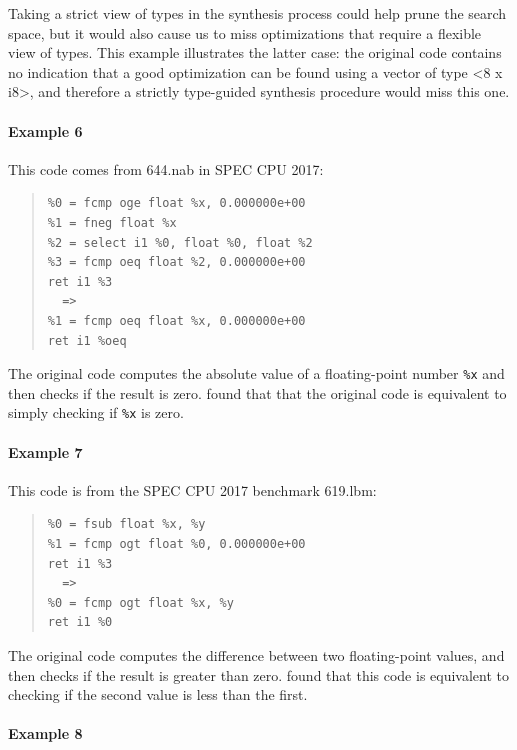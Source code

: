 Taking a strict view of types in the synthesis process could help
prune the search space, but it would also cause us to miss
optimizations that require a flexible view of types.
%
This example illustrates the latter case: the original code contains
no indication that a good optimization can be found using a vector of
type <8 x i8>, and therefore a strictly type-guided synthesis
procedure would miss this one.

\paragraph*{Example 6}

This code comes from 644.nab in SPEC CPU 2017:

{\small\begin{quote}\begin{verbatim}
%0 = fcmp oge float %x, 0.000000e+00
%1 = fneg float %x
%2 = select i1 %0, float %0, float %2
%3 = fcmp oeq float %2, 0.000000e+00
ret i1 %3
  =>
%1 = fcmp oeq float %x, 0.000000e+00
ret i1 %oeq
\end{verbatim}
\end{quote}}

The original code computes the absolute value of a floating-point
number \texttt{\%x} and then checks if the result is zero.
\minotaur{} found that that the original code is equivalent to simply checking if
\texttt{\%x} is zero.


\paragraph*{Example 7}

This code is from the SPEC CPU 2017 benchmark 619.lbm:

{\small\begin{quote}\begin{verbatim}
%0 = fsub float %x, %y
%1 = fcmp ogt float %0, 0.000000e+00
ret i1 %3
  =>
%0 = fcmp ogt float %x, %y
ret i1 %0
\end{verbatim}
\end{quote}}

The original code computes the difference between two floating-point
values, and then checks if the result is greater than zero. \minotaur{}
found that this code is equivalent to checking if the second value is
less than the first.


\paragraph*{Example 8}

